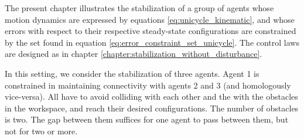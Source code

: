 The present chapter illustrates the stabilization of a group of agents whose
motion dynamics are expressed by equations \eqref{eq:unicycle_kinematic}, and
whose errors with respect to their respective steady-state configurations are
constrained by the set found in equation \eqref{eq:error_constraint_set_unicycle}.
The control laws are designed as in chapter
\ref{chapter:stabilization_without_disturbance}.

In this setting, we consider the stabilization of three agents. Agent 1
is constrained in maintaining connectivity with agents 2 and 3 (and
homologously vice-versa). All have to avoid colliding with each other
and the with the obstacles in the workspace, and reach their desired
configurations. The number of obstacles is two. The gap between them
suffices for one agent to pass between them, but not for two or more.


\begin{figure}[ht]\centering
  \scalebox{0.9}{}
  \label{fig}
\end{figure}
